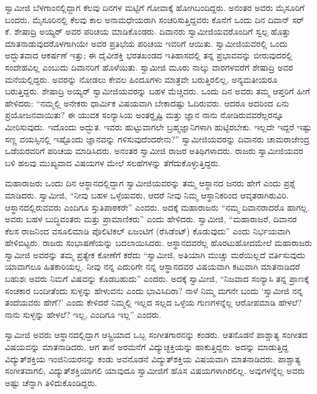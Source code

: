  ಸ್ವಾಮೀಜಿ ಬೆಳಗಾಂನಲ್ಲಿದ್ದಾಗ ಕೆಲವು ದಿನಗಳ ಮಟ್ಟಿಗೆ ಗೋವಾಕ್ಕೆ ಹೋಗಿಬಂದಿದ್ದರು. ಅನಂತರ ಅವರು ಮೈಸೂರಿಗೆ ಬಂದರು. ಮೈಸೂರಿನಲ್ಲಿ ಕೆಲವು ಕಾಲ ಅನಾಮಧೇಯರಾಗಿ ಸಂಚರಿಸುತ್ತಿದ್ದವರು ಕೊನೆಗೆ ಒಂದು ದಿನ ದಿವಾನ್ ಸರ್ ಕೆ. ಶೇಷಾದ್ರಿ ಅಯ್ಯರ್ ಅವರ ಪರಿಚಯ ಮಾಡಿಕೊಂಡರು. ದಿವಾನರು ಸ್ವಾಮೀಜಿಯವರೊಂದಿಗೆ ಸ್ವಲ್ಪ ಹೊತ್ತು ಮಾತನಾಡುವುದರೊಳಗಾಗಿಯೇ ಅವರ ಪ್ರತಿಭೆಯ ಪರಿಚಯ ಇವರಿಗೆ ಆಯಿತು. ಸ್ವಾಮೀಜಿಯವರಲ್ಲಿ ಒಂದು ಅದ್ಭುತವಾದ ಆಕರ್ಷಣೆ ಇತ್ತು; ಈ ದೈವೀಶಕ್ತಿ ಭರತಖಂಡದ ಇತಿಹಾಸದಲ್ಲಿ ತನ್ನ ಪ್ರಭಾವವನ್ನು ಬೀರುವುದರಲ್ಲಿ ಸಂದೇಹವಿಲ್ಲ ಎಂಬುದು ದಿವಾನರಿಗೆ ಹೊಳೆಯಿತು. ಸ್ವಾಮೀಜಿ ಮೂರು ನಾಲ್ಕು ವಾರಗಳವರೆಗೆ ಶೇಷಾದ್ರಿ ಅವರ ಮನೆಯಲ್ಲಿದ್ದರು. ಅವರನ್ನು ನೋಡಲು ಕೇವಲ ಹಿಂದೂಗಳು ಮಾತ್ರವೇ ಬರುತ್ತಿರಲಿಲ್ಲ, ಅನ್ಯಮತೀಯರೂ ಬರುತ್ತಿದ್ದರು. ಶೇಷಾದ್ರಿ ಅಯ್ಯರ್ ಸ್ವಾಮೀಜಿಯವರನ್ನು ಬಹಳ ಮೆಚ್ಚಿದರು. ಒಂದು ದಿನ ಅವರು ತಮ್ಮ ಆಪ್ತರಿಗೆ ಹೀಗೆ ಹೇಳಿದರು: “ನಮ್ಮಲ್ಲಿ ಅನೇಕರು ಧಾರ್ಮಿಕ ವಿಷಯವಾಗಿ ಬೇಕಾದಷ್ಟು ಓದಿರುವರು. ಆದರೂ ಅದರಿಂದ ಏನು ಪ್ರಯೋಜನವಾಯಿತು? ಈ ಯುವಕ ಸಂನ್ಯಾಸಿಯ ಅಂತರ್‍ದೃಷ್ಟಿ ಮತ್ತು ಜ್ಞಾನ ನಾನು ನೋಡಿರುವವರೆಲ್ಲರನ್ನೂ ಮೀರಿಸುವುದು. ಇದೊಂದು ಅದ್ಭುತ. ಇವರು ಹುಟ್ಟುವಾಗಲೇ ಬ್ರಹ್ಮಜ್ಞಾನಿಗಳಾಗಿ ಹುಟ್ಟಿರಬೇಕು. ಇಲ್ಲದೇ ಇದ್ದರೆ ಇಷ್ಟು ಸಣ್ಣ ವಯಸ್ಸಿನಲ್ಲಿ ಇಷ್ಟೊಂದು ಜ್ಞಾನವನ್ನು ಗಳಿಸುವುದೆಂದರೇನು?” ಸ್ವಾಮೀಜಿಯವರನ್ನು ದಿವಾನರು ಚಾಮರಾಜೇಂದ್ರ ಒಡೆಯರವರಿಗೆ ಪರಿಚಯ ಮಾಡಿಸಿದರು. ಅನಂತರ ಸ್ವಾಮೀಜಿ ರಾಜರ ಅತಿಥಿಗಳಾದರು. ರಾಜರು ಸ್ವಾಮೀಜಿಯವರ ಬಳಿ ಹಲವು ಮುಖ್ಯವಾದ ವಿಷಯಗಳ ಮೇಲೆ ಸಲಹೆಗಳನ್ನು ತೆಗೆದುಕೊಳ್ಳುತ್ತಿದ್ದರು. 

 ಮಹಾರಾಜರು ಒಂದು ದಿನ ಆಸ್ಥಾನದಲ್ಲಿದ್ದಾಗ ಸ್ವಾಮೀಜಿಯವರನ್ನು ತಮ್ಮ ಆಸ್ಥಾನದ ಜನರು ಹೇಗೆ ಎಂದು ಪ್ರಶ್ನೆ ಮಾಡಿದರು. ಸ್ವಾಮೀಜಿ, “ನೀವು ಬಹಳ ಒಳ್ಳೆಯವರು, ಆದರೆ ನೀವು ನಿಮ್ಮ ಆಸ್ಥಾನಿಕರಿಂದ ಆವೃತರಾಗಿರುವಿರಿ. ಆಸ್ಥಾನದಲ್ಲಿರುವವರು ಎಂದಿಗೂ ಸ್ತುತಿಪಾಠಕರೇ” ಎಂದರು. ಅದಕ್ಕೆ ಮಹಾರಾಜರು “ನಮ್ಮ ದಿವಾನರಾದರೊ ಹಾಗಲ್ಲ. ಅವರು ಬಹಳ ಬುದ್ಧಿವಂತರು ಮತ್ತು ಪ್ರಾಮಾಣಿಕರು” ಎಂದು ಹೇಳಿದರು. ಸ್ವಾಮೀಜಿ, “ಮಹಾರಾಜರೆ, ದಿವಾನರ ಕೆಲಸ ರಾಜನಿಂದ ವಸೂಲಿಮಾಡಿ ಪೊಲಿಟಿಕಲ್ ಏಜಂಟಿಗೆ (ರೆಸಿಡೆಂಟ್) ಕೊಡುವುದು” ಎಂದು ನಿರ್ಭಯವಾಗಿ ಹೇಳಿಬಿಟ್ಟರು. ರಾಜರು ಸಂಭಾಷಣೆಯನ್ನು ಬದಲಾಯಿಸಿದರು. ಆಸ್ಥಾನದವರೆಲ್ಲ ಹೊರಟುಹೋದಮೇಲೆ ಮಹಾರಾಜರು ಸ್ವಾಮೀಜಿ ಅವರನ್ನು ತಮ್ಮ ಪ್ರತ್ಯೇಕ ಕೋಣೆಗೆ ಕರೆದು “ಸ್ವಾಮೀಜಿ, ಅತಿಯಾಗಿ ಮುಚ್ಚು ಮರೆಯಿಲ್ಲದೆ ವರ್ತಿಸುವುದು ಯಾವಾಗಲೂ ಹಿತಕಾರಿಯಲ್ಲ. ನೀವು ನನ್ನ ಎದುರಿಗೇ ನನ್ನ ಆಸ್ಥಾನದವರ ವಿಷಯವಾಗಿ ಕಟುವಾಗಿ ಮಾತನಾಡಿದರೆ ಬಹುಶಃ ಅವರು ನಿಮಗೆ ವಿಷವನ್ನು ಕೊಡಬಹುದು” ಎಂದರು. ಅದಕ್ಕೆ ಸ್ವಾಮೀಜಿ, “ನಿಜವಾದ ಸಂನ್ಯಾಸಿ ತನ್ನ ಪ್ರಾಣಕ್ಕೆ ಸಂಚಕಾರ ಬಂದೀತೆಂದು ಸುಳ್ಳನ್ನು ಹೇಳುವನು ಎಂದು ಭಾವಿಸಿದಿರಾ? ನಾಳೆ ನಿಮ್ಮ ಮಗನೇ ಬಂದು ‘ಸ್ವಾಮೀಜಿ ನನ್ನ ತಂದೆಯವರು ಹೇಗೆ?’ ಎಂದು ಕೇಳಿದರೆ ನಿಮ್ಮಲ್ಲಿ ಇಲ್ಲದ ಸಲ್ಲದ ಒಳ್ಳೆಯ ಗುಣಗಳನ್ನೆಲ್ಲ ಆರೋಪಮಾಡಿ ಹೇಳಲೆ? ನಾನು ಸುಳ್ಳನ್ನು ಹೇಳಲೆ? ಇಲ್ಲ, ಎಂದಿಗೂ ಇಲ್ಲ” ಎಂದರು. 

 ಸ್ವಾಮೀಜಿ ಅವರು ಆಸ್ಥಾನದಲ್ಲಿದ್ದಾಗ ಆಸ್ಟ್ರಿಯಾದ ಒಬ್ಬ ಸಂಗೀತಗಾರನನ್ನು ಕಂಡರು. ಆತನೊಡನೆ ಪಾಶ್ಚಾತ್ಯ ಸಂಗೀತದ ವಿಷಯವನ್ನು ಮಾತನಾಡಿದರು. ಆಗ ತಾನೆ ಅರಮನೆಗೆ ವಿದ್ಯುಚ್ಛಕ್ತಿಯನ್ನು ಹಾಕುತ್ತಿದ್ದರು. ಅದನ್ನು ಮಾಡುತ್ತಿದ್ದ ವಿದ್ಯುತ್‍ಶಕ್ತಿಯ ಇಂಜಿನಿಯರನನ್ನು ಕಂಡು ಅವನೊಡನೆ ವಿದ್ಯುತ್‍ಶಕ್ತಿಯ ವಿಷಯವಾಗಿ ಮಾತನಾಡಿದರು. ಪಾಶ್ಚಾತ್ಯ ಸಂಗೀತವಾಗಲಿ, ವಿದ್ಯುತ್‍ಶಕ್ತಿಯಾಗಲಿ ಯಾವುದೂ ಸ್ವಾಮೀಜಿಗೆ ಹೊಸ ವಿಷಯಗಳಾಗಿರಲಿಲ್ಲ. ಅವುಗಳನ್ನೆಲ್ಲ ಅವರು ಅಷ್ಟು ಚೆನ್ನಾಗಿ ತಿಳಿದುಕೊಂಡಿದ್ದರು. 

